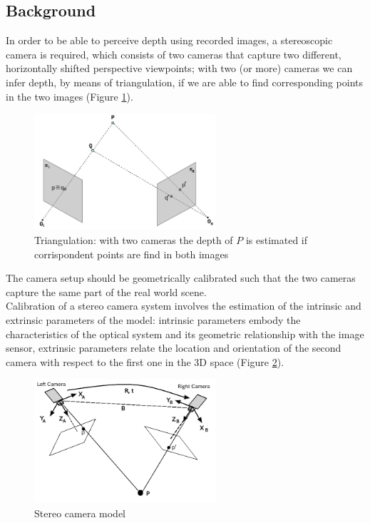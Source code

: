 \subsection{Background}

In order to be able to perceive depth using recorded images, a stereoscopic camera is required,
which consists of two cameras that capture two different, horizontally shifted perspective
viewpoints; with two (or more) cameras we can infer depth, by means of triangulation, if we are able to find corresponding points in the two images (Figure \ref{fig:corr}).\\
\begin{figure}[h!]
\centering
\includegraphics[width=0.6\textwidth]{./img/correspondance.png}
\caption{\small{Triangulation: with two cameras the depth of $P$ is estimated if corrispondent points are find in both images}}
\label{fig:corr}
\end{figure}
 The camera setup should be geometrically
calibrated such that the two cameras capture the same part of the real world scene.\\
Calibration of a stereo camera system involves the estimation of the intrinsic and extrinsic parameters of the model\cite{SV2}: intrinsic parameters embody the characteristics of the optical system and its geometric relationship with the image sensor, extrinsic parameters relate the location and orientation of the second camera with respect to the first one in the 3D space (Figure \ref{fig:rt}).\\
\begin{figure}[h!]
\centering
\includegraphics[width=0.6\textwidth]{./img/stereo_system.png}
\caption{\small{Stereo camera model}}
\label{fig:rt}
\end{figure}
